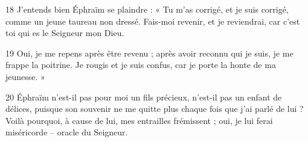 
18 J’entends bien Éphraïm se plaindre : « Tu m’as corrigé, et je suis corrigé, comme un jeune taureau non dressé. Fais-moi revenir, et je reviendrai, car c’est toi qui es le Seigneur mon Dieu.

19 Oui, je me repens après être revenu ; après avoir reconnu qui je suis, je me frappe la poitrine. Je rougis et je suis confus, car je porte la honte de ma jeunesse. »

20 Éphraïm n’est-il pas pour moi un fils précieux, n’est-il pas un enfant de délices, puisque son souvenir ne me quitte plus chaque fois que j’ai parlé de lui ? Voilà pourquoi, à cause de lui, mes entrailles frémissent ; oui, je lui ferai miséricorde – oracle du Seigneur.
